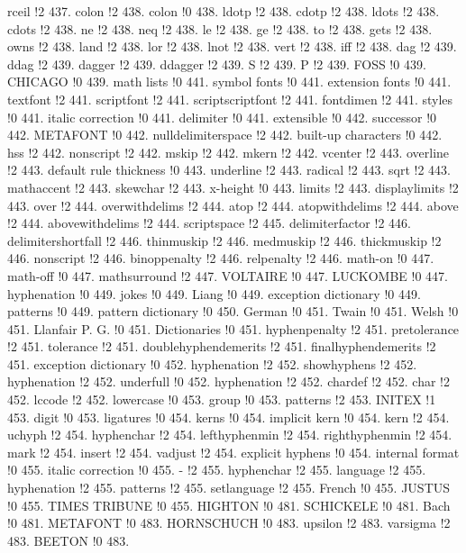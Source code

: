 rceil !2 437.
colon !2 438.
colon !0 438.
ldotp !2 438.
cdotp !2 438.
ldots !2 438.
cdots !2 438.
ne !2 438.
neq !2 438.
le !2 438.
ge !2 438.
to !2 438.
gets !2 438.
owns !2 438.
land !2 438.
lor !2 438.
lnot !2 438.
vert !2 438.
iff !2 438.
dag !2 439.
ddag !2 439.
dagger !2 439.
ddagger !2 439.
S !2 439.
P !2 439.
FOSS !0 439.
CHICAGO !0 439.
math lists !0 441.
symbol fonts !0 441.
extension fonts !0 441.
textfont !2 441.
scriptfont !2 441.
scriptscriptfont !2 441.
fontdimen !2 441.
styles !0 441.
italic correction !0 441.
delimiter !0 441.
extensible !0 442.
successor !0 442.
METAFONT !0 442.
nulldelimiterspace !2 442.
built-up characters !0 442.
hss !2 442.
nonscript !2 442.
mskip !2 442.
mkern !2 442.
vcenter !2 443.
overline !2 443.
default rule thickness !0 443.
underline !2 443.
radical !2 443.
sqrt !2 443.
mathaccent !2 443.
skewchar !2 443.
x-height !0 443.
limits !2 443.
displaylimits !2 443.
over !2 444.
overwithdelims !2 444.
atop !2 444.
atopwithdelims !2 444.
above !2 444.
abovewithdelims !2 444.
scriptspace !2 445.
delimiterfactor !2 446.
delimitershortfall !2 446.
thinmuskip !2 446.
medmuskip !2 446.
thickmuskip !2 446.
nonscript !2 446.
binoppenalty !2 446.
relpenalty !2 446.
math-on !0 447.
math-off !0 447.
mathsurround !2 447.
VOLTAIRE !0 447.
LUCKOMBE !0 447.
hyphenation !0 449.
jokes !0 449.
Liang !0 449.
exception dictionary !0 449.
patterns !0 449.
pattern dictionary !0 450.
German !0 451.
Twain !0 451.
Welsh !0 451.
Llanfair P. G. !0 451.
Dictionaries !0 451.
hyphenpenalty !2 451.
pretolerance !2 451.
tolerance !2 451.
doublehyphendemerits !2 451.
finalhyphendemerits !2 451.
exception dictionary !0 452.
hyphenation !2 452.
showhyphens !2 452.
hyphenation !2 452.
underfull !0 452.
hyphenation !2 452.
chardef !2 452.
char !2 452.
lccode !2 452.
lowercase !0 453.
group !0 453.
patterns !2 453.
INITEX !1 453.
digit !0 453.
ligatures !0 454.
kerns !0 454.
implicit kern !0 454.
kern !2 454.
uchyph !2 454.
hyphenchar !2 454.
lefthyphenmin !2 454.
righthyphenmin !2 454.
mark !2 454.
insert !2 454.
vadjust !2 454.
explicit hyphens !0 454.
internal format !0 455.
italic correction !0 455.
- !2 455.
hyphenchar !2 455.
language !2 455.
hyphenation !2 455.
patterns !2 455.
setlanguage !2 455.
French !0 455.
JUSTUS !0 455.
TIMES TRIBUNE !0 455.
HIGHTON !0 481.
SCHICKELE !0 481.
Bach !0 481.
METAFONT !0 483.
HORNSCHUCH !0 483.
upsilon !2 483.
varsigma !2 483.
BEETON !0 483.
